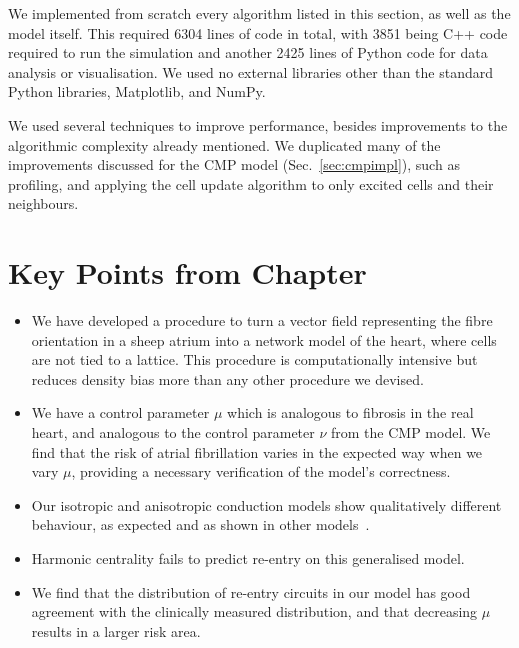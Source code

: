 We implemented from scratch every algorithm listed in this section, as well as the model itself. This required 6304 lines of code in total, with 3851 being C++ code required to run the simulation and another 2425 lines of Python code for data analysis or visualisation. We used no external libraries other than the standard Python libraries, Matplotlib, and NumPy.

We used several techniques to improve performance, besides improvements to the algorithmic complexity already mentioned. We duplicated many of the improvements discussed for the CMP model (Sec.~\ref{sec:cmpimpl}), such as profiling, and applying the cell update algorithm to only excited cells and their neighbours. 

\section{Key Points from Chapter \thechapter}

\begin{itemize}
    \item We have developed a procedure to turn a vector field representing the fibre orientation in a sheep atrium into a network model of the heart, where cells are not tied to a lattice. This procedure is computationally intensive but reduces density bias more than any other procedure we devised.
    \item We have a control parameter $\mu$ which is analogous to fibrosis in the real heart, and analogous to the control parameter $\nu$ from the CMP model. We find that the risk of atrial fibrillation varies in the expected way when we vary $\mu$, providing a necessary verification of the model's correctness.
    \item Our isotropic and anisotropic conduction models show qualitatively different behaviour, as expected and as shown in other models~\cite{zhao}.
    \item Harmonic centrality fails to predict re-entry on this generalised model.
    \item We find that the distribution of re-entry circuits in our model has good agreement with the clinically measured distribution, and that decreasing $\mu$ results in a larger risk area.
\end{itemize}
